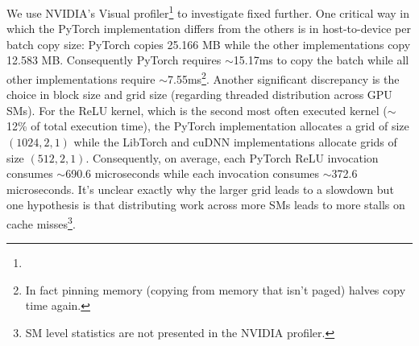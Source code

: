 We use NVIDIA's Visual profiler\footnote{} to investigate fixed  further.
One critical way in which the PyTorch implementation differs from the others is in host-to-device per batch copy size: PyTorch copies 25.166 MB while the other implementations copy 12.583 MB\@.
Consequently PyTorch requires $\sim$15.17ms to copy the batch while all other implementations require $\sim$7.55ms\footnote{In fact pinning memory (copying from memory that isn't paged) halves copy time again.}.
Another significant discrepancy is the choice in block size and grid size (regarding threaded distribution across GPU SMs).
For the ReLU kernel, which is the second most often executed kernel ($\sim$12\% of total execution time), the PyTorch implementation allocates a grid of size $\left( 1024,2,1 \right)$ while the LibTorch and cuDNN implementations allocate grids of size $\left( 512,2,1 \right)$.
Consequently, on average, each PyTorch ReLU invocation consumes $\sim$690.6 microseconds while each invocation consumes $\sim$372.6 microseconds.
It's unclear exactly why the larger grid leads to a slowdown but one hypothesis is that distributing work across more SMs leads to more stalls on cache misses\footnote{SM level statistics are not presented in the NVIDIA profiler.}.



